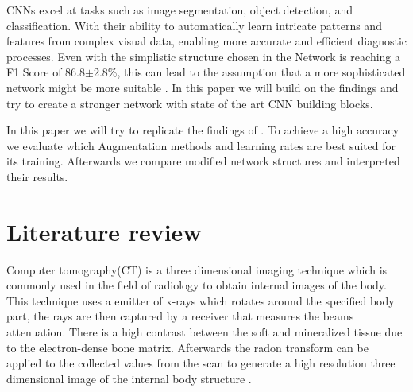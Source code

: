 \documentclass[
a4paper, 
12pt,
grayscalebody, %
abstract=on,
twoside, BCOR10mm, 12pt, DIV13,headinclude, footexclude, final, abstracton, openright
]{ibireprt}
\numberwithin{equation}{chapter}
\numberwithin{table}{chapter}
\numberwithin{figure}{chapter}
\numberwithin{algorithm}{chapter}
\numberwithin{example}{chapter}
\numberwithin{example}{chapter}
\begin{document}
CNNs excel at tasks such as image segmentation, object detection, and classification. With their ability to automatically learn intricate patterns and features from complex visual data, enabling more accurate and efficient diagnostic processes. %
Even with the simplistic structure chosen in \cite{Walle2023} the Network is reaching a F1 Score of 86.8$\pm$2.8\%, this can lead to the assumption that a more sophisticated network might be more suitable . In this paper we will build on the findings and try to create a stronger network with state of the art CNN building blocks.  

In this paper we will try to replicate the findings of \cite{Walle2023}. To achieve a high accuracy we evaluate which Augmentation methods and learning rates are best suited for its training. Afterwards we compare modified network structures and interpreted their results. 



\chapter{Literature review}

	Computer tomography(CT) is a three dimensional imaging technique which is commonly used in the field of radiology  to obtain internal images of the body. This technique uses a emitter of x-rays which rotates around the specified body part, the rays are then captured by a receiver that measures the beams attenuation. There is a high contrast between the soft and mineralized tissue  due to the electron-dense bone matrix. Afterwards the radon transform can be applied to the collected values from the scan to generate a high resolution three dimensional image of the internal body structure \cite{Burghardt2011}.
\end{document}
